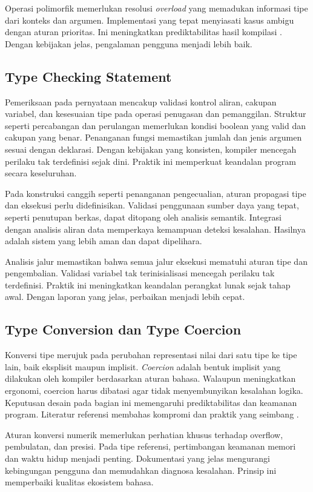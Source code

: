 \documentclass[../main.tex]{subfiles}
\begin{document}
Operasi polimorfik memerlukan resolusi \emph{overload} yang memadukan informasi tipe dari konteks dan argumen. Implementasi yang tepat menyiasati kasus ambigu dengan aturan prioritas. Ini meningkatkan prediktabilitas hasil kompilasi \citep{WikiTypeChecking}. Dengan kebijakan jelas, pengalaman pengguna menjadi lebih baik.

\subsection{Type Checking Statement}
Pemeriksaan pada pernyataan mencakup validasi kontrol aliran, cakupan variabel, dan kesesuaian tipe pada operasi penugasan dan pemanggilan. Struktur seperti percabangan dan perulangan memerlukan kondisi boolean yang valid dan cakupan yang benar. Penanganan fungsi memastikan jumlah dan jenis argumen sesuai dengan deklarasi. Dengan kebijakan yang konsisten, kompiler mencegah perilaku tak terdefinisi sejak dini. Praktik ini memperkuat keandalan program secara keseluruhan.

Pada konstruksi canggih seperti penanganan pengecualian, aturan propagasi tipe dan eksekusi perlu didefinisikan. Validasi penggunaan sumber daya yang tepat, seperti penutupan berkas, dapat ditopang oleh analisis semantik. Integrasi dengan analisis aliran data memperkaya kemampuan deteksi kesalahan. Hasilnya adalah sistem yang lebih aman dan dapat dipelihara.

Analisis jalur memastikan bahwa semua jalur eksekusi mematuhi aturan tipe dan pengembalian. Validasi variabel tak terinisialisasi mencegah perilaku tak terdefinisi. Praktik ini meningkatkan keandalan perangkat lunak sejak tahap awal. Dengan laporan yang jelas, perbaikan menjadi lebih cepat.

\subsection{Type Conversion dan Type Coercion}
Konversi tipe merujuk pada perubahan representasi nilai dari satu tipe ke tipe lain, baik eksplisit maupun implisit. \emph{Coercion} adalah bentuk implisit yang dilakukan oleh kompiler berdasarkan aturan bahasa. Walaupun meningkatkan ergonomi, coercion harus dibatasi agar tidak menyembunyikan kesalahan logika. Keputusan desain pada bagian ini memengaruhi prediktabilitas dan keamanan program. Literatur referensi membahas kompromi dan praktik yang seimbang \citep{WikiCoercion}.

Aturan konversi numerik memerlukan perhatian khusus terhadap overflow, pembulatan, dan presisi. Pada tipe referensi, pertimbangan keamanan memori dan waktu hidup menjadi penting. Dokumentasi yang jelas mengurangi kebingungan pengguna dan memudahkan diagnosa kesalahan. Prinsip ini memperbaiki kualitas ekosistem bahasa.
\end{document}
